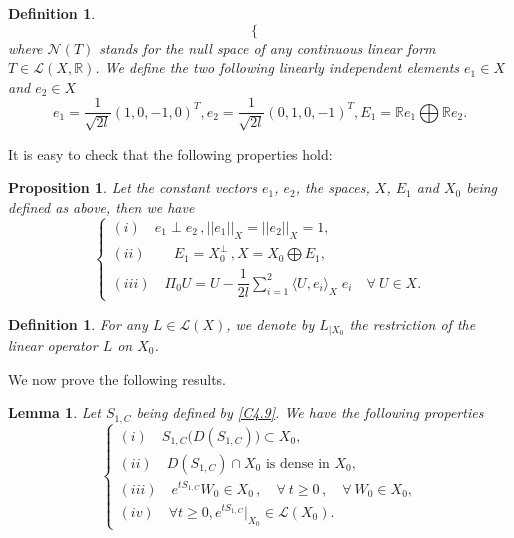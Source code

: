 \documentclass[10pt, english]{article}
\newtheorem{prop}[thm]{Proposition}
\newtheorem{dfn}[thm]{Definition}
\newtheorem{lem}[thm]{Lemma}
\begin{document}
{\begin{dfn}
\begin{equation}
\begin{cases}
\end{cases}
\end{equation}
where $\mathcal{N}(T)$ stands for the null space of any continuous linear form $T \in \mathcal{L}(X,\mathbb{R})$.
We define the two following linearly independent elements $e_1 \in X$ and $e_2 \in X$ 
\begin{equation}\label{C4.39}%
e_1=\dfrac{1}{\sqrt{2l}}(1, 0, -1, 0)^T , e_2=\dfrac{1}{\sqrt{2l}}(0,1,0,-1)^T, E_1= \mathbb{R}e_1 \bigoplus \mathbb{R}e_2.
\end{equation}
\end{dfn}
It is easy to check that the following properties hold:
\begin{prop}\label{Prop3}
Let the constant vectors $e_1$, $e_2$, the spaces, $X$, $E_1$ and $X_0$ being defined as above, then we have
\begin{equation}\label{C4.40}%
\begin{cases}
(i) \quad e_1\perp e_2\,, ||e_1||_X=||e_2||_X=1, \\
(ii) \quad \quad E_1= X_0^{\perp}\,, X= X_0 \bigoplus E_1,\\
(iii) \quad \Pi_0U = \displaystyle{U -\dfrac{1}{2l}\sum_{i=1}^2\langle U,e_i\rangle_X \;e_i }\quad \forall \ U \in X.
\end{cases}
\end{equation}

\end{prop}
\begin{dfn}
For any $L \in \mathcal{L}(X)$, we denote by $L_{| X_0}$ the restriction of the linear operator $L$ on $X_0$.
\end{dfn}
We now prove the following results.
\begin{lem}\label{Lm1}
Let $S_{1,C}$ being defined by \eqref{C4.9}.
We have the following properties
\begin{equation}\label{C4.41}%
\begin{cases}
(i) \quad S_{1,C}\big(D(S_{1,C})\big) \subset X_0, \\
(ii) \quad D(S_{1,C}) \cap X_0 \mbox{ is dense in } X_0,\\
(iii) \quad e^{tS_{1,C}}W_0 \in X_0\,, \quad \forall \ t \geqslant 0\,, \quad \forall \ W_0 \in X_0,\\
(iv) \quad \forall t \geqslant 0, e^{tS_{1,C}}|_{X_0} \in \mathcal{L}(X_0).
\end{cases}
\end{equation}


\end{lem}}
\end{document}
